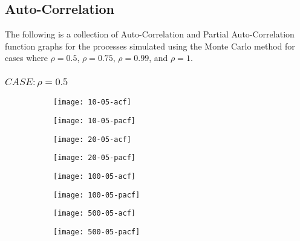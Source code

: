 \subsection{Auto-Correlation}

The following is a collection of Auto-Correlation and Partial Auto-Correlation function graphs for the processes simulated using the Monte Carlo method for cases where $\rho = 0.5$, $\rho = 0.75$, $\rho = 0.99$, and $\rho = 1$.

\subsubsection{$CASE: \rho = 0.5$}

\begin{figure}[htp]
	\centering
	\begin{subfigure}{0.23\textwidth}
		\centering
		\texttt{[image: 10-05-acf]}
	\end{subfigure}
	\begin{subfigure}{0.23\textwidth}
		\centering
		\texttt{[image: 10-05-pacf]}
	\end{subfigure}
	\begin{subfigure}{0.23\textwidth}
		\centering
		\texttt{[image: 20-05-acf]}
	\end{subfigure}
	\begin{subfigure}{0.23\textwidth}
		\centering
		\texttt{[image: 20-05-pacf]}
	\end{subfigure}
\end{figure}

\begin{figure}[htp]
	\centering
	\begin{subfigure}{0.23\textwidth}
		\centering
		\texttt{[image: 100-05-acf]}
	\end{subfigure}
	\begin{subfigure}{0.23\textwidth}
		\centering
		\texttt{[image: 100-05-pacf]}
	\end{subfigure}
	\begin{subfigure}{0.23\textwidth}
		\centering
		\texttt{[image: 500-05-acf]}
	\end{subfigure}
	\begin{subfigure}{0.23\textwidth}
		\centering
		\texttt{[image: 500-05-pacf]}
	\end{subfigure}
\end{figure}

